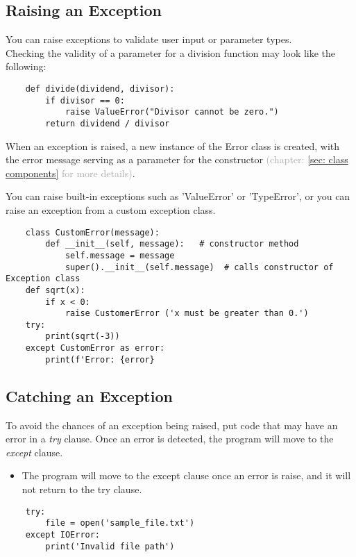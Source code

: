 \subsection{Raising an Exception}
You can raise exceptions to validate user input or parameter types.\\
Checking the validity of a parameter for a division function may look like the following:
\begin{verbatim}
    def divide(dividend, divisor):
        if divisor == 0:
            raise ValueError("Divisor cannot be zero.")
        return dividend / divisor
\end{verbatim}

When an exception is raised, a new instance of the Error class is created, with the error message serving as a parameter for the constructor \textcolor{darkgray}{(chapter: \ref{sec: class components} for more details)}.

You can raise built-in exceptions such as 'ValueError' or 'TypeError', or you can raise an exception from a custom exception class.
\begin{verbatim}
    class CustomError(message):
        def __init__(self, message):   # constructor method
            self.message = message
            super().__init__(self.message)  # calls constructor of Exception class
    def sqrt(x):
        if x < 0:
            raise CustomerError ('x must be greater than 0.')
    try:
        print(sqrt(-3))
    except CustomError as error:
        print(f'Error: {error}
\end{verbatim}

\subsection{Catching an Exception}
To avoid the chances of an exception being raised, put code that may have an error in a \textit{try} clause. Once an error is detected, the program will move to the \textit{except} clause.
\begin{itemize}
    \item The program will move to the except clause once an error is raise, and it will not return to the try clause.
\end{itemize}

\begin{verbatim}
    try:
        file = open('sample_file.txt')
    except IOError:
        print('Invalid file path')
\end{verbatim}

